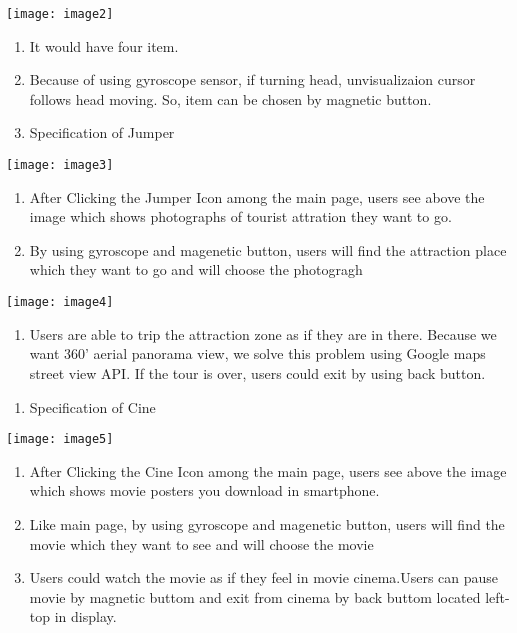 \documentclass{article}
\begin{document}
\noindent \texttt{[image: image2]}

\noindent 

\begin{enumerate}
\item  It would have four item.

\item  Because of using gyroscope sensor, if turning head, unvisualizaion cursor follows head moving. So, item can be chosen by magnetic button.

\item  Specification of Jumper
\end{enumerate}

\noindent \texttt{[image: image3]}

\begin{enumerate}
\item  After Clicking the Jumper Icon among the main page, users see above the image which shows photographs of tourist attration they want to go.   

\item  By using gyroscope and magenetic button, users will find the attraction place which they want to go and will choose the photogragh
\end{enumerate}

\noindent \texttt{[image: image4]}

\begin{enumerate}
\item  Users are able to trip the attraction zone as if they are in there. Because we want 360' aerial panorama view, we solve this problem using Google maps street view API. If the tour is over, users could exit by using back button.
\end{enumerate}

\noindent 

\begin{enumerate}
\item  Specification of Cine
\end{enumerate}

\noindent \texttt{[image: image5]}

\noindent 

\begin{enumerate}
\item  After Clicking the Cine Icon among the main page, users see above the image which shows movie posters you download in smartphone.   

\item  Like main page, by using gyroscope and magenetic button, users will find the movie which they want to see and will choose the movie

\item  Users could watch the movie as if they feel in movie cinema.Users can pause movie by magnetic buttom and exit from cinema by back buttom located left-top in display.
\end{enumerate}
\end{document}
